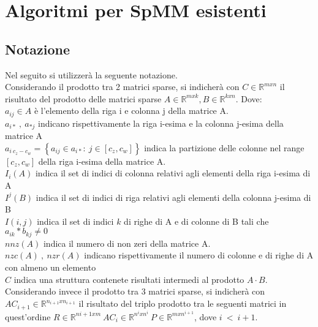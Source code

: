 \chapter{Algoritmi per SpMM esistenti}
\label{ChExistingTecqs}



\section{Notazione}	\label{notazione}
Nel seguito si utilizzerà la seguente notazione.\\
Considerando il prodotto tra 2 matrici sparse, si indicherà con $C \in \mathbb{R}^{m x n}$ il risultato del prodotto delle matrici sparse 
$A \in \mathbb{R}^{m x k},B \in \mathbb{R}^{k x n}$. Dove:\\ 
$a_{ij} \in A$ è l'elemento della riga i e colonna j della matrice A.\\
$a_{i*}~,~a_{*j}$ indicano rispettivamente la riga i-esima e la colonna j-esima della matrice A\\
$a_{i~c_z-c_w} = \left\{ a_{ij} \in a_{i*} :~ j \in [c_z,c_w] \right\}$  
indica la partizione delle colonne nel range $[c_z,c_w]$ della riga i-esima della matrice A.\\

$I_i(A)$ indica il set di indici di colonna relativi agli elementi \nnz della riga i-esima di A\\
$I^j(B)$ indica il set di indici di riga relativi agli elementi \nnz della colonna j-esima di B\\
$I(i,j)$ indica il set di indici $k$ di righe di A e di colonne di B tali che
$a_{ik}*b_{kj} \neq 0$\\
$nnz(A)$ indica il numero di non zeri della matrice A. \\ 
$nzc(A)~,~nzr(A)$ indicano rispettivamente il numero di colonne e di righe di A con almeno un elemento \nnz\\
$\hat{C}$ indica una struttura contenete risultati intermedi al prodotto $A \cdot B$.\\

\label{notazioneSp3MM}
Considerando invece il prodotto tra 3 matrici sparse, %
si indicherà con $AC_{i+1} \in \mathbb{R}^{n_{i+1} x n_{i+1} }$ il risultato del triplo prodotto tra le seguenti matrici in quest'ordine
$R \in \mathbb{R}^{n{i+1} x m} ~  AC_i \in \mathbb{R}^{n^i x n^i} ~ P \in \mathbb{R}^{m x n^{i+1}}$, dove $i~<~i+1$.\\

